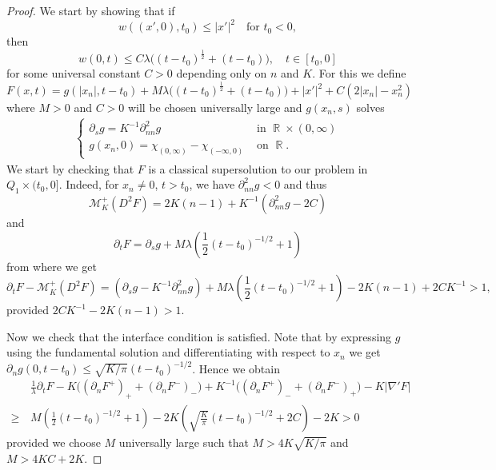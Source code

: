 \documentclass[12pt]{article}
\numberwithin{Theorem}{section}
\theoremstyle{definition}
\theoremstyle{remark}
\numberwithin{equation}{section}
\DeclareMathOperator{\R}{\mathbb{R}}
\newcommand*{\Mp}{\mathcal{M}_{K}^{+}}
\newcommand{\p}{\partial}
\begin{document}
\begin{proof}
    We start by showing that if 
    \begin{equation}\label{eq:claim_initial_assump}
         w((x',0),t_0)\leq |x'|^2 \quad \text{for } t_0 <0,
    \end{equation}
    then
    \begin{equation} \label{eq:claim_tracetime}
         w(0,t)\leq C\lambda \big((t-t_0)^\frac{1}{2}+(t-t_0)\big), \quad t \in [t_0, 0]
    \end{equation}
    for some universal constant $C>0$ depending only on $n$ and $K$. For this we define
    \[
    F(x,t)=g(|x_n|,t-t_0)+M\lambda\big((t-t_0)^\frac{1}{2}+(t-t_0)\big)+|x'|^2+C(2|x_n|-x_n^2)
    \]
    where $M>0$ and $C>0$ will be chosen universally large and $g(x_n,s)$ solves 
    \begin{equation} \label{eq:construction_g}
    \begin{aligned}
        \begin{cases}
           \p_s  g=K^{-1}\p_{nn}^2 g &\mbox{ in } \R\times(0,\infty)\\
            g(x_n,0)=\chi_{(0,\infty)}-\chi_{(-\infty,0)}&\mbox{ on } \R.
        \end{cases}
    \end{aligned}
    \end{equation}
    We start by checking that $F$ is a classical supersolution to our problem in $Q_1 \times (t_0,0]$. Indeed, for $x_n\neq 0$, $t>t_0$, we have $\p_{nn}^2 g<0$ and thus
    \[
    \Mp(D^2F)=2K(n-1)+K^{-1}(\p_{nn}^2 g-2C)
    \]
    and
    \[
    \p_t F=\p_s g+M\lambda\left(\frac{1}{2}(t-t_0)^{-1/2}+1\right)
    \]
    from where we get
    \[
    \p_tF-\Mp(D^2F)=(\p_sg-K^{-1}\p^2_{nn}g)+M\lambda\left(\frac{1}{2}(t-t_0)^{-1/2}+1\right)-2K(n-1)+2C K^{-1}>1,
    \]
    provided $2CK^{-1} - 2K(n-1) > 1$.

    Now we check that the interface condition is satisfied. Note that by expressing $g$ using the fundamental solution and differentiating with respect to $x_n$ we get $\p_n g(0,t-t_0)\leq \sqrt{K/\pi} (t-t_0)^{-1/2}$. Hence we obtain
    \begin{align*}
        &\frac{1}{\lambda}\p_t F-K\big( (\p_n F^+)_+ + (\p_n F^-)_-\big)+K^{-1}\big( (\p_nF^+)_- + (\p_n F^-)_+\big)-K|\nabla' F|\\
        \geq\,&M\left(\frac{1}{2}(t-t_0)^{-1/2}+1\right)- 2K\left(\sqrt{\frac{K}{\pi}} (t-t_0)^{-1/2} + 2C\right) - 2K > 0
\end{align*}
provided we choose $M$ universally large such that $M > 4K\sqrt{K/\pi}$ and $M > 4KC + 2K$.
    


\end{proof}
\end{document}
